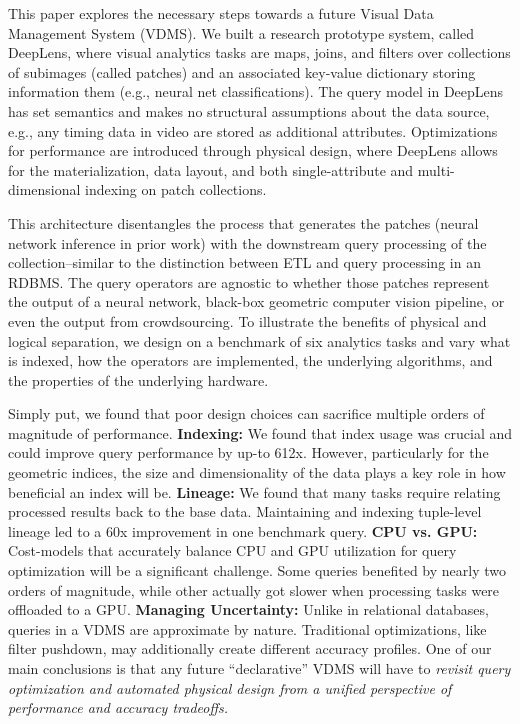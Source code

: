 This paper explores the necessary steps towards a future Visual Data Management System (VDMS).
We built a research prototype system, called \textsf{DeepLens}, where visual analytics tasks are maps, joins, and filters over collections of subimages (called patches) and an associated key-value dictionary storing information them (e.g., neural net classifications). The query model in \textsf{DeepLens} has set semantics and makes no structural assumptions about the data source, e.g., any timing data in video are stored as additional attributes. Optimizations for performance are introduced through physical design, where \textsf{DeepLens} allows for the materialization, data layout, and both single-attribute and multi-dimensional indexing on patch collections.

This architecture disentangles the process that generates the patches (neural network inference in prior work) with the downstream query processing of the collection--similar to the distinction between ETL and query processing in an RDBMS.
The query operators are agnostic to whether those patches represent the output of a neural network, black-box geometric computer vision pipeline, or even the output from crowdsourcing. 
To illustrate the benefits of physical and logical separation, we design on a benchmark of six analytics tasks and vary what is indexed, how the operators are implemented, the underlying algorithms, and the properties of the underlying hardware.
 
Simply put, we found that poor design choices can sacrifice multiple orders of magnitude of performance.
\textbf{Indexing: } We found that index usage was crucial and could improve query performance by up-to 612x. However, particularly for the geometric indices, the size and dimensionality of the data plays a key role in how beneficial an index will be.
\textbf{Lineage: }We found that many tasks require relating processed results back to the base data.
Maintaining and indexing tuple-level lineage led to a 60x improvement in one benchmark query.
\textbf{CPU vs. GPU: } Cost-models that accurately balance CPU and GPU utilization for query optimization will be a significant challenge. Some queries benefited by nearly two orders of magnitude, while other actually got slower when processing tasks were offloaded to a GPU.
\textbf{Managing Uncertainty: } Unlike in relational databases, queries in a VDMS are approximate by nature. Traditional optimizations, like filter pushdown, may additionally create different accuracy profiles.  One of our main conclusions is that any future ``declarative'' VDMS will have to \emph{revisit query optimization and automated physical design from a unified perspective of performance and accuracy tradeoffs.}  








